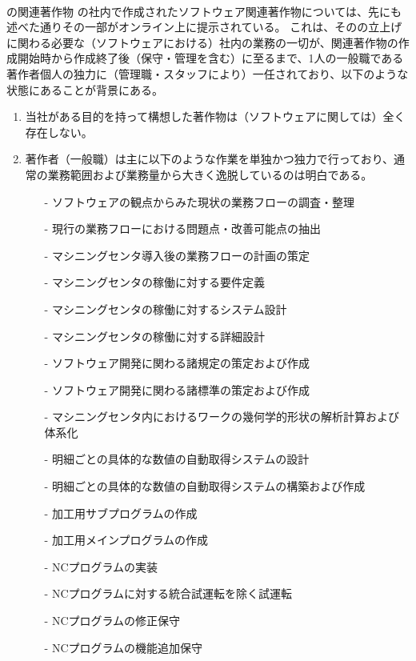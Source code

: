 \clearpage
~\vfill
\begin{Column}{\DMC の関連著作物}
\DMC の社内で作成されたソフトウェア関連著作物については、先にも述べた通りその一部がオンライン上に提示されている。
これは、その\DMC の立上げに関わる必要な（ソフトウェアにおける）社内の業務の一切が、関連著作物の作成開始時から作成終了後（保守・管理を含む）に至るまで、1人の一般職である著作者個人の独力に（管理職・スタッフにより）一任されており、以下のような状態にあることが背景にある。
\tcbline*
\begin{enumerate}[label=\Roman*]
\item 当社がある目的を持って構想した著作物は（ソフトウェアに関しては）全く存在しない。
\item
著作者（一般職）は主に以下のような作業を単独かつ独力で行っており、通常の業務範囲および業務量から大きく逸脱しているのは明白である。
  \begin{enumerate}
  \item[-] ソフトウェアの観点からみた現状の業務フローの調査・整理
  \item[-] 現行の業務フローにおける問題点・改善可能点の抽出
  \item[-] マシニングセンタ導入後の業務フローの計画の策定
  \item[-] マシニングセンタの稼働に対する要件定義
  \item[-] マシニングセンタの稼働に対するシステム設計
  \item[-] マシニングセンタの稼働に対する詳細設計
  \item[-] ソフトウェア開発に関わる諸規定の策定および作成
  \item[-] ソフトウェア開発に関わる諸標準の策定および作成
  \item[-] マシニングセンタ内におけるワークの幾何学的形状の解析計算および体系化
  \item[-] 明細ごとの具体的な数値の自動取得システムの設計
  \item[-] 明細ごとの具体的な数値の自動取得システムの構築および作成
  \item[-] 加工用サブプログラムの作成
  \item[-] 加工用メインプログラムの作成
  \item[-] NCプログラムの実装
  \item[-] NCプログラムに対する統合試運転を除く試運転
  \item[-] NCプログラムの修正保守
  \item[-] NCプログラムの機能追加保守

\end{enumerate}
\end{enumerate}
\end{Column}
